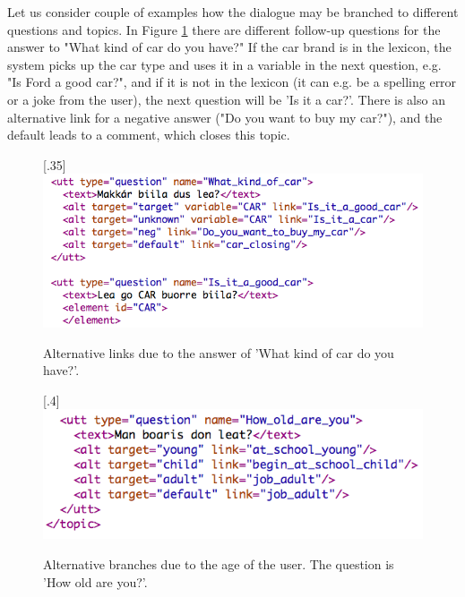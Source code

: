 \documentclass[11pt]{article}
\begin{document}

Let us consider couple of examples how the dialogue may be branched to different questions and topics. In Figure \ref{car} there are different follow-up questions for the answer to "What kind of car do you have?" If the car brand is in the lexicon, the system picks up the car type and uses it in a variable in the next question, e.g. "Is Ford a good car?", and if it is not in the lexicon (it can e.g. be a spelling error or a joke from the user), the next question will be 'Is it a car?'. There is also an alternative link for a negative answer ("Do you want to buy my car?"), and the default leads to a comment, which closes this topic. \\

\begin{figure}[htbp]
\begin{center}
\scalebox{.35}[.35]{\includegraphics{presentation/img/what_car.png}}\\
\caption{Alternative links due to the answer of 'What kind of car do you have?'.}
\label{car}
\end{center}
\end{figure}

\begin{figure}[htbp]
\begin{center}
\scalebox{.4}[.4]{\includegraphics{presentation/img/age_branching.png}}\\
\caption{Alternative branches due to the age of the user. The question is 'How old are you?'.}
\label{agebranches}
\end{center}
\end{figure}
\end{document}
